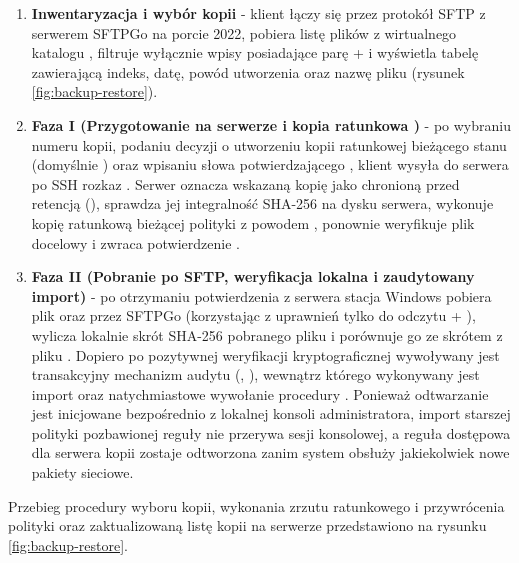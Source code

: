 \begin{enumerate}
    \item \textbf{Inwentaryzacja i wybór kopii} - klient łączy się przez protokół SFTP z serwerem SFTPGo na porcie 2022, pobiera listę plików z wirtualnego katalogu , filtruje wyłącznie wpisy posiadające parę  +  i wyświetla tabelę zawierającą indeks, datę, powód utworzenia oraz nazwę pliku (rysunek \ref{fig:backup-restore}).
    \item \textbf{Faza I (Przygotowanie na serwerze i kopia ratunkowa )} - po wybraniu numeru kopii, podaniu decyzji o utworzeniu kopii ratunkowej bieżącego stanu (domyślnie ) oraz wpisaniu słowa potwierdzającego , klient wysyła do serwera po SSH rozkaz . Serwer oznacza wskazaną kopię jako chronioną przed retencją (), sprawdza jej integralność SHA-256 na dysku serwera, wykonuje kopię ratunkową bieżącej polityki z powodem , ponownie weryfikuje plik docelowy i zwraca potwierdzenie .
    \item \textbf{Faza II (Pobranie po SFTP, weryfikacja lokalna i zaudytowany import)} - po otrzymaniu potwierdzenia z serwera stacja Windows pobiera plik  oraz  przez SFTPGo (korzystając z uprawnień tylko do odczytu  + ), wylicza lokalnie skrót SHA-256 pobranego pliku i porównuje go ze skrótem z pliku . Dopiero po pozytywnej weryfikacji kryptograficznej wywoływany jest transakcyjny mechanizm audytu (, ), wewnątrz którego wykonywany jest import  oraz natychmiastowe wywołanie procedury . Ponieważ odtwarzanie jest inicjowane bezpośrednio z lokalnej konsoli administratora, import starszej polityki pozbawionej reguły  nie przerywa sesji konsolowej, a reguła dostępowa dla serwera kopii zostaje odtworzona zanim system obsłuży jakiekolwiek nowe pakiety sieciowe.
\end{enumerate}

Przebieg procedury wyboru kopii, wykonania zrzutu ratunkowego  i przywrócenia polityki oraz zaktualizowaną listę kopii na serwerze przedstawiono na rysunku \ref{fig:backup-restore}.

